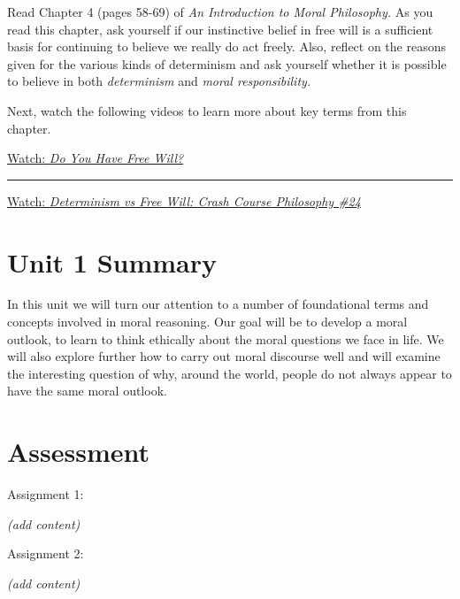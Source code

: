 \documentclass[
]{book}
\begin{document}
\begin{reflect}
Read Chapter 4 (pages 58-69) of \emph{An Introduction to Moral Philosophy.} As you read this chapter, ask yourself if our instinctive belief in free will is a sufficient basis for continuing to believe we really do act freely. Also, reflect on the reasons given for the various kinds of determinism and ask yourself whether it is possible to believe in both \emph{determinism} and \emph{moral responsibility.}

Next, watch the following videos to learn more about key terms from this chapter.

\href{https://www.youtube.com/watch?v=EMdAnU3vYzA\&t=2s}{Watch: \emph{Do You Have Free Will?}}

\begin{center}\rule{0.5\linewidth}{0.5pt}\end{center}

\href{https://www.youtube.com/watch?v=vCGtkDzELAI}{Watch: \emph{Determinism vs Free Will: Crash Course Philosophy \#24}}
\end{reflect}

\hypertarget{unit-1-summary}{%
\section*{Unit 1 Summary}\label{unit-1-summary}}

In this unit we will turn our attention to a number of foundational terms and concepts involved in moral reasoning. Our goal will be to develop a moral outlook, to learn to think ethically about the moral questions we face in life. We will also explore further how to carry out moral discourse well and will examine the interesting question of why, around the world, people do not always appear to have the same moral outlook.

\hypertarget{assessment-1}{%
\section*{Assessment}\label{assessment-1}}

\begin{assessment}
{Assignment 1:}

\emph{(add content)}

{Assignment 2:}

\emph{(add content)}
\end{assessment}
\end{document}

